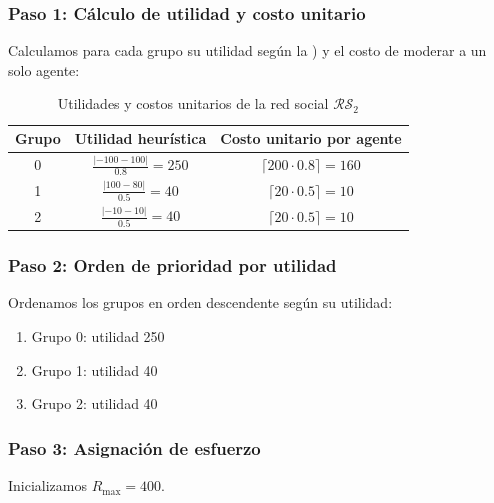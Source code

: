 \documentclass[11pt,letter]{article}
\begin{document}
\subsubsection*{Paso 1: Cálculo de utilidad y costo unitario}

Calculamos para cada grupo su utilidad según la ) y el costo de moderar a un solo agente:

\begin{table}[H]
\centering
\begin{tabular}{c|c|c}
\textbf{Grupo} & Utilidad heurística & Costo unitario por agente \\
\hline
0 & $\frac{|-100 - 100|}{0.8} = 250$ & $\lceil 200 \cdot 0.8 \rceil = 160$ \\
1 & $\frac{|100 - 80|}{0.5} = 40$ & $\lceil 20 \cdot 0.5 \rceil = 10$ \\
2 & $\frac{|-10 - 10|}{0.5} = 40$ & $\lceil 20 \cdot 0.5 \rceil = 10$ \\
\end{tabular}
\caption{Utilidades y costos unitarios de la red social $\mathcal{RS}_2$}
\end{table}

\subsubsection*{Paso 2: Orden de prioridad por utilidad}

Ordenamos los grupos en orden descendente según su utilidad:

\begin{enumerate}
    \item Grupo 0: utilidad 250
    \item Grupo 1: utilidad 40
    \item Grupo 2: utilidad 40
\end{enumerate}

\subsubsection*{Paso 3: Asignación de esfuerzo}

Inicializamos $R_{\text{max}} = 400$.
\end{document}
